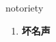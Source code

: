 
\begin{frame}
{\huge notoriety}
\begin{center}
\begin{enumerate}\Large
  \item \textbf{坏名声}
\end{enumerate}
\end{center}
\end{frame}
